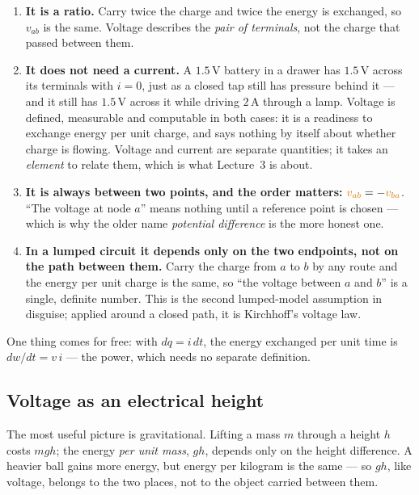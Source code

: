 \documentclass[11pt,a4paper]{article}
\newcommand{\Vcol}[1]{\textcolor{cvolt}{#1}}
\newcommand{\uni}[1]{\,\mathrm{#1}}
\newcommand{\A}{\uni{A}}   \newcommand{\V}{\uni{V}}
\begin{document}
\begin{enumerate}
  \item \textbf{It is a ratio.} Carry twice the charge and twice the energy is exchanged,
        so $v_{ab}$ is the same. Voltage describes the \emph{pair of terminals}, not the
        charge that passed between them.
  \item \textbf{It does not need a current.} A $1.5\V$ battery in a drawer has $1.5\V$
        across its terminals with $i = 0$, just as a closed tap still has pressure behind
        it --- and it still has $1.5\V$ across it while driving $2\A$ through a lamp.
        Voltage is defined, measurable and computable in both cases: it is a readiness to
        exchange energy per unit charge, and says nothing by itself about whether charge
        is flowing. Voltage and current are separate quantities; it takes an
        \emph{element} to relate them, which is what Lecture~3 is about.
  \item \textbf{It is always between two points, and the order matters:}
        $\Vcol{v_{ab}} = -\Vcol{v_{ba}}$. ``The voltage at node $a$'' means nothing until
        a reference point is chosen --- which is why the older name
        \emph{potential difference} is the more honest one.
  \item \textbf{In a lumped circuit it depends only on the two endpoints, not on the
        path between them.} Carry the charge from $a$ to $b$ by any route and the energy
        per unit charge is the same, so ``the voltage between $a$ and $b$'' is a single,
        definite number. This is the second lumped-model assumption in disguise; applied
        around a closed path, it is Kirchhoff's voltage law.
\end{enumerate}

One thing comes for free: with $dq = i\,dt$, the energy exchanged per unit time is
$dw/dt = v\,i$ --- the power, which needs no separate definition.

\subsection{Voltage as an electrical height}

The most useful picture is gravitational. Lifting a mass $m$ through a height $h$ costs
$mgh$; the energy \emph{per unit mass}, $gh$, depends only on the height difference. A
heavier ball gains more energy, but energy per kilogram is the same --- so $gh$, like
voltage, belongs to the two places, not to the object carried between them.
\end{document}
